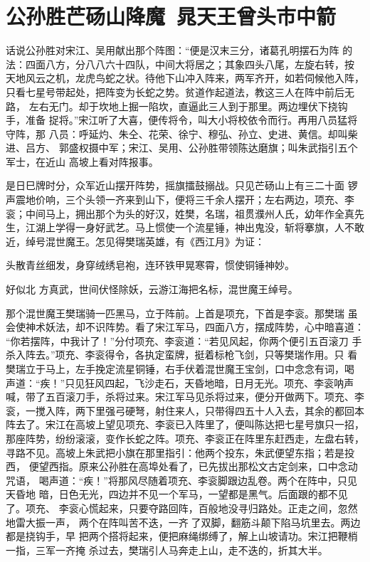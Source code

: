 \chapter{公孙胜芒砀山降魔~晁天王曾头市中箭}

话说公孙胜对宋江、吴用献出那个阵图：“便是汉末三分，诸葛孔明摆石为阵
的法：四面八方，分八八六十四队，中间大将居之；其象四头八尾，左旋右转，按
天地风云之机，龙虎鸟蛇之状。待他下山冲入阵来，两军齐开，如若伺候他入阵，
只看七星号带起处，把阵变为长蛇之势。贫道作起道法，教这三人在阵中前后无路，
左右无门。却于坎地上掘一陷坎，直逼此三人到于那里。两边埋伏下挠钩手，准备
捉将。”宋江听了大喜，便传将令，叫大小将校依令而行。再用八员猛将守阵，那
八员：呼延灼、朱仝、花荣、徐宁、穆弘、孙立、史进、黄信。却叫柴进、吕方、
郭盛权摄中军；宋江、吴用、公孙胜带领陈达磨旗；叫朱武指引五个军士，在近山
高坡上看对阵报事。

是日巳牌时分，众军近山摆开阵势，摇旗擂鼓搦战。只见芒砀山上有三二十面
锣声震地价响，三个头领一齐来到山下，便将三千余人摆开；左右两边，项充、李
衮；中间马上，拥出那个为头的好汉，姓樊，名瑞，祖贯濮州人氏，幼年作全真先
生，江湖上学得一身好武艺。马上惯使一个流星锤，神出鬼没，斩将搴旗，人不敢
近，绰号混世魔王。怎见得樊瑞英雄，有《西江月》为证：

头散青丝细发，身穿绒绣皂袍，连环铁甲晃寒霄，惯使铜锤神妙。

好似北
方真武，世间伏怪除妖，云游江海把名标，混世魔王绰号。

那个混世魔王樊瑞骑一匹黑马，立于阵前。上首是项充，下首是李衮。那樊瑞
虽会使神术妖法，却不识阵势。看了宋江军马，四面八方，摆成阵势，心中暗喜道：
“你若摆阵，中我计了！”分付项充、李衮道：“若见风起，你两个便引五百滚刀
手杀入阵去。”项充、李衮得令，各执定蛮牌，挺着标枪飞剑，只等樊瑞作用。只
看樊瑞立于马上，左手挽定流星铜锤，右手伏着混世魔王宝剑，口中念念有词，喝
声道：“疾！”只见狂风四起，飞沙走石，天昏地暗，日月无光。项充、李衮呐声
喊，带了五百滚刀手，杀将过来。宋江军马见杀将过来，便分开做两下。项充、李
衮，一搅入阵，两下里强弓硬弩，射住来人，只带得四五十人入去，其余的都回本
阵去了。宋江在高坡上望见项充、李衮已入阵里了，便叫陈达把七星号旗只一招，
那座阵势，纷纷滚滚，变作长蛇之阵。项充、李衮正在阵里东赶西走，左盘右转，
寻路不见。高坡上朱武把小旗在那里指引：他两个投东，朱武便望东指；若是投西，
便望西指。原来公孙胜在高埠处看了，已先拔出那松文古定剑来，口中念动咒语，
喝声道：“疾！”将那风尽随着项充、李衮脚跟边乱卷。两个在阵中，只见天昏地
暗，日色无光，四边并不见一个军马，一望都是黑气。后面跟的都不见了。项充、
李衮心慌起来，只要夺路回阵，百般地没寻归路处。正走之间，忽然地雷大振一声，
两个在阵叫苦不迭，一齐了双脚，翻筋斗颠下陷马坑里去。两边都是挠钩手，早
把两个搭将起来，便把麻绳绑缚了，解上山坡请功。宋江把鞭梢一指，三军一齐掩
杀过去，樊瑞引人马奔走上山，走不迭的，折其大半。

